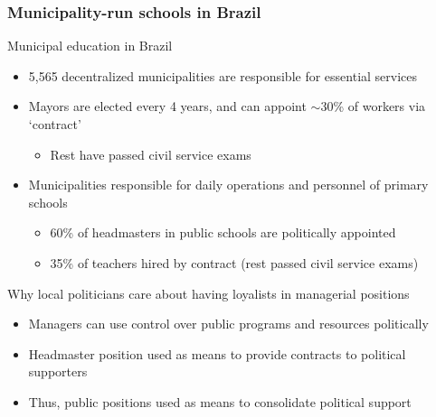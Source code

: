 \documentclass[aspectratio=169]{beamer}
\begin{document}
\begin{frame}
\frametitle{Municipality-run schools in Brazil} 
Municipal education in Brazil
\begin{itemize}\setlength\itemsep{3pt}
\item 5,565 decentralized municipalities are responsible for essential services
\item Mayors are elected every 4 years, and can appoint $\sim$30\% of workers via `contract'
\begin{itemize}\setlength\itemsep{3pt}
\item Rest have passed civil service exams
\end{itemize}
\item Municipalities responsible for daily operations and personnel of primary schools
\begin{itemize}\setlength\itemsep{3pt}
\item 60\% of headmasters in public schools are politically appointed
\item 35\% of teachers hired by contract (rest passed civil service exams)
\end{itemize}
\end{itemize}\medskip
Why local politicians care about having loyalists in managerial positions
\begin{itemize}\setlength\itemsep{3pt}
\item Managers can use control over public programs and resources politically
\item Headmaster position used as means to provide contracts to political supporters
\item Thus, public positions used as means to consolidate political support
\end{itemize}
\end{frame}
\end{document}
